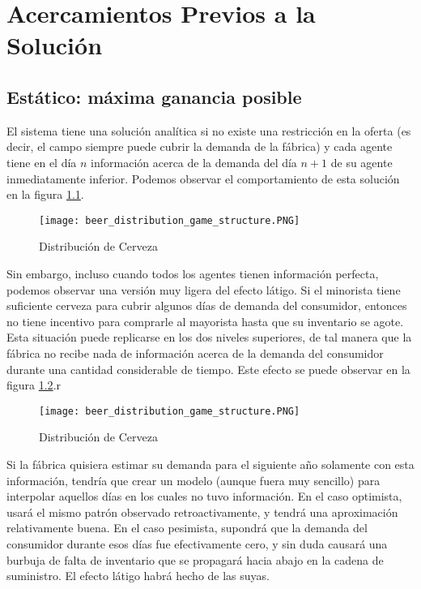 \chapter{Acercamientos Previos a la Soluci\'on}

\section{Est\'atico: m\'axima ganancia posible}

El sistema tiene una soluci\'on anal\'itica si no existe una restricci\'on en la oferta (es decir, el campo siempre puede cubrir la demanda de la f\'abrica) y cada agente tiene en el d\'ia $n$ informaci\'on acerca de la demanda del d\'ia $n+1$ de su agente inmediatamente inferior. Podemos observar el comportamiento de esta soluci\'on en la figura \ref{analytic_1}.

\begin{figure}[h!]
\caption{Distribuci\'on de Cerveza}
\label{analytic_1}
\texttt{[image: beer\_distribution\_game\_structure.PNG]}
\centering
\end{figure}

Sin embargo, incluso cuando todos los agentes tienen informaci\'on perfecta, podemos observar una versi\'on muy ligera del efecto l\'atigo. Si el minorista tiene suficiente cerveza para cubrir algunos d\'ias de demanda del consumidor, entonces no tiene incentivo para comprarle al mayorista hasta que su inventario se agote. Esta situaci\'on puede replicarse en los dos niveles superiores, de tal manera que la f\'abrica no recibe nada de informaci\'on acerca de la demanda del consumidor durante una cantidad considerable de tiempo. Este efecto se puede observar en la figura \ref{analytic_2}.r

\begin{figure}[h!]
\caption{Distribuci\'on de Cerveza}
\label{analytic_2}
\texttt{[image: beer\_distribution\_game\_structure.PNG]}
\centering
\end{figure}

Si la f\'abrica quisiera estimar su demanda para el siguiente a\~no solamente con esta informaci\'on, tendr\'ia que crear un modelo (aunque fuera muy sencillo) para interpolar aquellos d\'ias en los cuales no tuvo informaci\'on. En el caso optimista, usar\'a el mismo patr\'on observado retroactivamente, y tendr\'a una aproximaci\'on relativamente buena. En el caso pesimista, supondr\'a que la demanda del consumidor durante esos d\'ias fue efectivamente cero, y sin duda causar\'a una burbuja de falta de inventario que se propagar\'a hacia abajo en la cadena de suministro. El efecto l\'atigo habr\'a hecho de las suyas.\\

